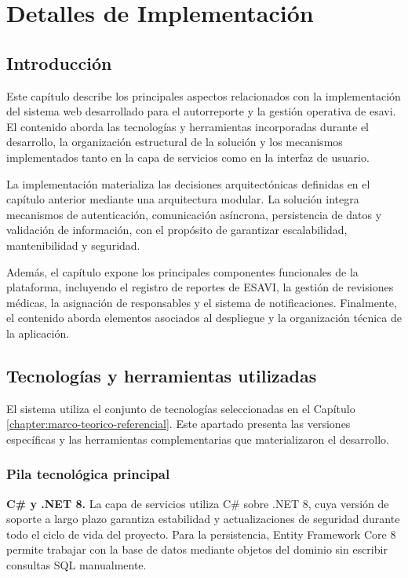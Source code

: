 \chapter{Detalles de Implementación}
\label{chapter:implementation}

\section{Introducción}

Este capítulo describe los principales aspectos relacionados con la implementación del sistema web desarrollado para el autorreporte y la gestión operativa de \gls{esavi}. 
El contenido aborda las tecnologías y herramientas incorporadas durante el desarrollo, la organización estructural de la solución y los mecanismos implementados tanto en la capa de servicios como en la interfaz de usuario.

La implementación materializa las decisiones arquitectónicas definidas en el capítulo anterior mediante una arquitectura modular. 
La solución integra mecanismos de autenticación, comunicación asíncrona, persistencia de datos y validación de información, con el propósito de garantizar escalabilidad, mantenibilidad y seguridad.

Además, el capítulo expone los principales componentes funcionales de la plataforma, incluyendo el registro de reportes de ESAVI, la gestión de revisiones médicas, la asignación de responsables y el sistema de notificaciones. 
Finalmente, el contenido aborda elementos asociados al despliegue y la organización técnica de la aplicación.

\section{Tecnologías y herramientas utilizadas}
\label{section:technologies}

El sistema utiliza el conjunto de tecnologías seleccionadas en el Capítulo \ref{chapter:marco-teorico-referencial}. 
Este apartado presenta las versiones específicas y las herramientas complementarias que materializaron el desarrollo.

\subsection{Pila tecnológica principal}

\textbf{C\# y .NET 8.} La capa de servicios utiliza C\# sobre .NET 8, cuya versión de soporte a largo plazo garantiza estabilidad y actualizaciones de seguridad durante todo el ciclo de vida del proyecto. 
Para la persistencia, Entity Framework Core 8 permite trabajar con la base de datos mediante objetos del dominio sin escribir consultas SQL manualmente.

